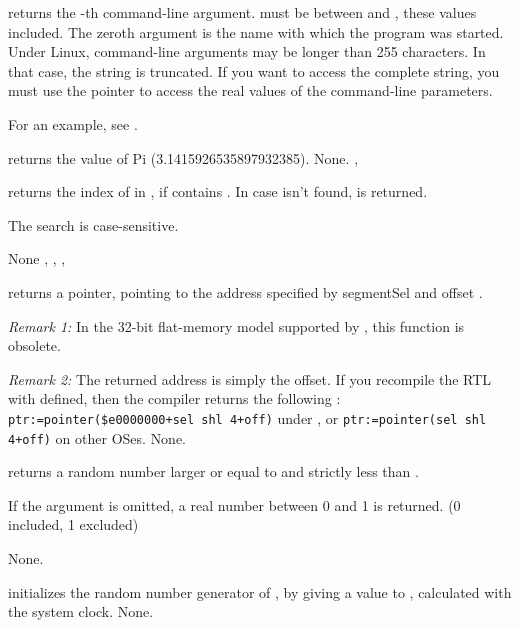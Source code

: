 \documentclass{report}
\begin{document}
{ returns the -th command-line argument.  must
be between  and , these values included.
The zeroth argument is the name with which the program was started.
}
{Under Linux, command-line arguments may be longer than 255 characters. In
that case, the string is truncated. If you want to access the complete
string, you must use the  pointer to access the real values of the
command-line parameters.}
{}

For an example, see .

{ returns the value of Pi (3.1415926535897932385).}
{None.}
{, }




{ returns the index of  in , if  contains
. In case  isn't found,  is returned.

The search is case-sensitive.
}
{None}
{, , , }




{ returns a pointer, pointing to the address specified by
segment{Sel} and offset .

{\em Remark 1:} In the 32-bit flat-memory model supported by \fpc, this
function is obsolete.}

{\em Remark 2:} The returned address is simply the offset. If you recompile
the RTL with  defined, then the compiler returns the
following : \verb|ptr:=pointer($e0000000+sel shl 4+off)| under \dos, or
\verb|ptr:=pointer(sel shl 4+off)| on other OSes.
{None.}
{}


{ returns a random number larger or equal to  and
strictly less than .

If the argument  is omitted, a real number between 0 and 1 is returned.
(0 included, 1 excluded)}
{None.}
{}




{ initializes the random number generator of \fpc, by giving
a value to , calculated with the system clock.
}
{None.}
{}
\end{document}

